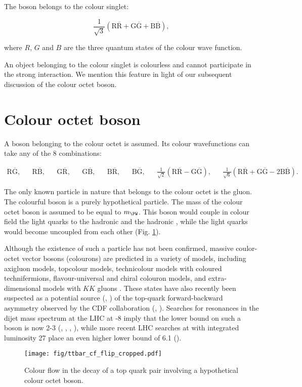 The \PW boson belongs to the colour singlet:

\begin{equation}
\frac{1}{\sqrt{3}}\left(\text{R}\overline{\text{R}}+\text{G}\overline{\text{G}}+\text{B}\overline{\text{B}}\right),
\end{equation}

where $R$, $G$ and $B$ are the three quantum states of the colour wave function.

An object belonging to the colour singlet is colourless and cannot participate in the strong interaction. We mention this feature in light of our subsequent discussion of the colour octet \PW boson.

\section{Colour octet \PW boson}

A \PW boson belonging to the colour octet is assumed. Its colour wavefunctions can take any of the 8 combinations:

\begin{align}
\text{R}\overline{\text{G}}, &&
\text{R}\overline{\text{B}}, &&
\text{G}\overline{\text{R}}, &&
\text{G}\overline{\text{B}}, &&
\text{B}\overline{\text{R}}, &&
\text{B}\overline{\text{G}}, &&
\frac{1}{\sqrt{2}}\left(\text{R}\overline{\text{R}}-\text{G}\overline{\text{G}}\right), &&
\frac{1}{\sqrt{6}}\left(\text{R}\overline{\text{R}}+\text{G}\overline{\text{G}}-2\text{B}\overline{\text{B}}\right).
\end{align}

The only known particle in nature that belongs to the colour octet is the gluon. The colourful \PW boson is a purely hypothetical particle. The mass of the colour octet \PW boson is assumed to be equal to $m_{\PW}$. This boson would couple in colour field the light quarks to the hadronic \cPqb and the hadronic \cPqt, while the light quarks would become uncoupled from each other (Fig. \ref{fig:ttbar_cf_octet}).

Although the existence of such a particle has not been confirmed, massive coulor-octet vector bosons (colourons) are predicted in a variety of models, including axigluon models, topcolour models, technicolour models with coloured technifermions, flavour-universal and chiral colouron models, and extra-dimensional models with $KK$ gluons \cite{Chivukula:2013xla}.  These states have also recently been suspected as a potential source (\cite{Ferrario:2009bz}, \cite{Frampton:2009rk}) of the top-quark forward-backward asymmetry observed by the CDF collaboration (\cite{Aaltonen:2008hc}, \cite{Aaltonen:2011kc}). Searches for resonances in the dijet mass spectrum at the LHC at -8 \TeV imply that the lower bound on such a boson is now 2-3 \TeV (\cite{Han:2010rf}, \cite{Haisch:2011up}, \cite{Chatrchyan:2011ns}, \cite{Aad:2011fq}), while more recent LHC searches at  \TeV with integrated luminosity 27 \fbinv place an even higher lower bound of 6.1 \TeV (\cite{CMS:2017xrr}).
  
  \begin{figure}[h!]
  \centering
  \texttt{[image: fig/ttbar\_cf\_flip\_cropped.pdf]}
  \caption{Colour flow in the decay of a top quark pair involving a hypothetical colour octet \PW boson.}
  \label{fig:ttbar_cf_octet}
\end{figure}

